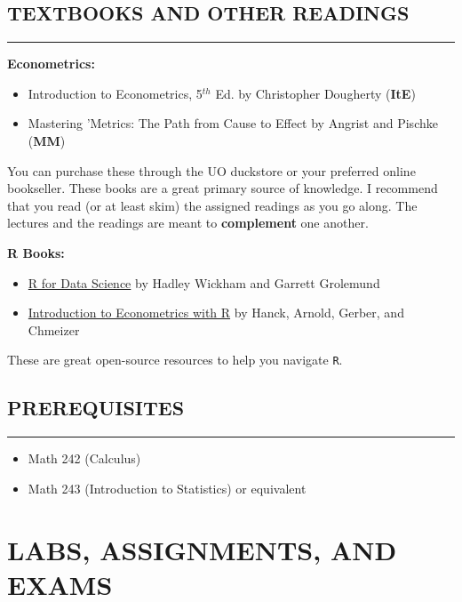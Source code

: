 \subsection*{TEXTBOOKS AND OTHER READINGS}
\vspace*{-0.5cm}
\rule{\textwidth}{2pt}
\vspace{0.1cm}

\textbf{Econometrics:}
\begin{itemize}
    \item Introduction to Econometrics, 5$^{th}$ Ed. by Christopher Dougherty (\textbf{ItE})
    \item Mastering 'Metrics: The Path from Cause to Effect by Angrist and Pischke (\textbf{MM})
\end{itemize}

You can purchase these through the UO duckstore or your preferred online bookseller. 
These books are a great primary source of knowledge. 
I recommend that you read (or at least skim) the assigned readings as you go along. 
The lectures and the readings are meant to \textbf{complement} one another. 

\vspace{0.75cm}

\textbf{R Books:}
\begin{itemize}
    \item \hyperlink{target name}{R for Data Science} by Hadley Wickham and Garrett Grolemund
    \item \hyperlink{target name}{Introduction to Econometrics with R} by Hanck, Arnold, Gerber, and Chmeizer
\end{itemize}

These are great open-source resources to help you navigate \texttt{R}.

\subsection*{PREREQUISITES}
\vspace*{-0.5cm}
\rule{\textwidth}{2pt}
\begin{itemize}
    \item Math 242 (Calculus)
    \item Math 243 (Introduction to Statistics) or equivalent
\end{itemize}

\section*{LABS, ASSIGNMENTS, AND EXAMS}

